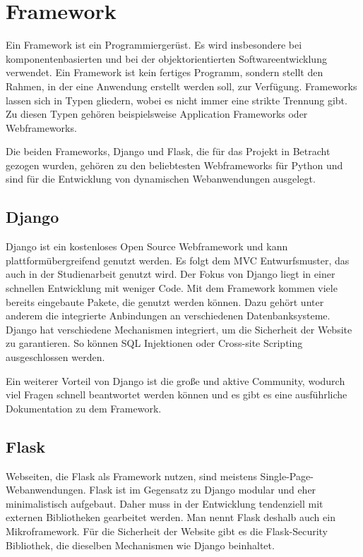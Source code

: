 \section{Framework}
Ein Framework ist ein Programmiergerüst. Es wird insbesondere bei komponentenbasierten und bei der objektorientierten Softwareentwicklung verwendet. Ein Framework ist kein fertiges Programm, sondern stellt den Rahmen, in der eine Anwendung erstellt werden soll, zur Verfügung. Frameworks lassen sich in Typen gliedern, wobei es nicht immer eine strikte Trennung gibt. Zu diesen Typen gehören beispielsweise  Application Frameworks oder Webframeworks.

Die beiden Frameworks, Django und Flask, die für das Projekt in Betracht gezogen wurden, gehören zu den beliebtesten Webframeworks für Python und sind für die Entwicklung von dynamischen Webanwendungen ausgelegt. 

\subsection{Django}
Django ist ein kostenloses Open Source Webframework und kann plattformübergreifend genutzt werden. Es folgt dem \ac{MVC} Entwurfsmuster, das auch in der Studienarbeit genutzt wird. Der Fokus von Django liegt in einer schnellen Entwicklung mit weniger Code. Mit dem Framework kommen viele bereits eingebaute Pakete, die genutzt werden können. Dazu gehört unter anderem die integrierte Anbindungen an verschiedenen Datenbanksysteme. Django hat verschiedene Mechanismen integriert, um die Sicherheit der Website zu garantieren. So können SQL Injektionen oder Cross-site Scripting ausgeschlossen werden.

Ein weiterer Vorteil von Django ist die große und aktive Community, wodurch viel Fragen schnell beantwortet werden können und es gibt es eine ausführliche Dokumentation zu dem Framework. 

\subsection{Flask}
Webseiten, die Flask als Framework nutzen, sind meistens Single-Page-Webanwendungen. Flask ist im Gegensatz zu Django modular und eher minimalistisch aufgebaut. Daher muss in der Entwicklung tendenziell mit externen Bibliotheken gearbeitet werden. Man nennt Flask deshalb auch ein Mikroframework. Für die Sicherheit der Website gibt es die Flask-Security Bibliothek, die dieselben Mechanismen wie Django beinhaltet.

